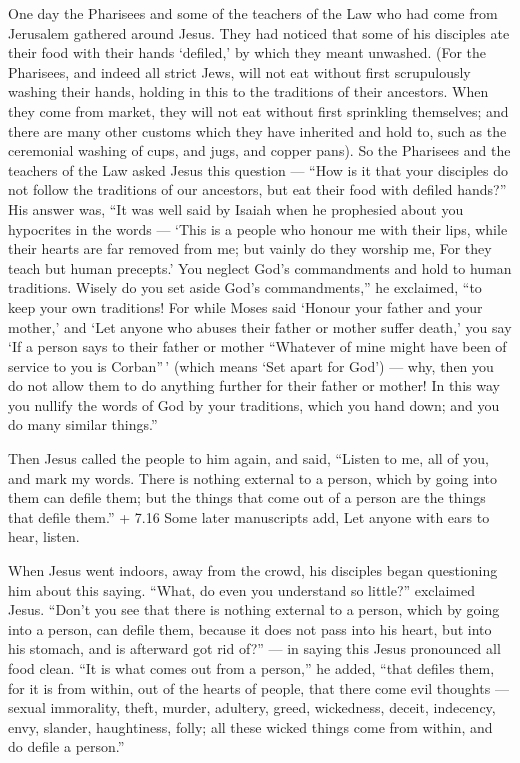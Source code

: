  One day the Pharisees and some of the teachers of the Law
who had come from Jerusalem gathered around Jesus.  They had
noticed that some of his disciples ate their food with their hands
`defiled,' by which they meant unwashed.  (For the
Pharisees, and indeed all strict Jews, will not eat without first
scrupulously washing their hands, holding in this to the traditions of
their ancestors.  When they come from market, they will not
eat without first sprinkling themselves; and there are many other
customs which they have inherited and hold to, such as the ceremonial
washing of cups, and jugs, and copper pans).  So the
Pharisees and the teachers of the Law asked Jesus this question ---
``How is it that your disciples do not follow the traditions of our
ancestors, but eat their food with defiled hands?''  His
answer was, ``It was well said by Isaiah when he prophesied about you
hypocrites in the words --- `This is a people who honour me with their
lips, while their hearts are far removed from me;  but
vainly do they worship me, For they teach but human precepts.'
 You neglect God's commandments and hold to human
traditions.  Wisely do you set aside God's commandments,''
he exclaimed, ``to keep your own traditions!  For while
Moses said `Honour your father and your mother,' and `Let anyone who
abuses their father or mother suffer death,'  you say `If a
person says to their father or mother ``Whatever of mine might have been
of service to you is Corban''\,' (which means `Set apart for God') ---
 why, then you do not allow them to do anything further for
their father or mother!  In this way you nullify the words
of God by your traditions, which you hand down; and you do many similar
things.''

 Then Jesus called the people to him again, and said,
``Listen to me, all of you, and mark my words.  There is
nothing external to a person, which by going into them can defile them;
but the things that come out of a person are the things that defile
them.''  + 7.16 Some later manuscripts add, Let anyone with
ears to hear, listen.

 When Jesus went indoors, away from the crowd, his
disciples began questioning him about this saying.  ``What,
do even you understand so little?'' exclaimed Jesus. ``Don't you see
that there is nothing external to a person, which by going into a
person, can defile them,  because it does not pass into his
heart, but into his stomach, and is afterward got rid of?'' --- in
saying this Jesus pronounced all food clean.  ``It is what
comes out from a person,'' he added, ``that defiles them, 
for it is from within, out of the hearts of people, that there come evil
thoughts --- sexual immorality, theft, murder, adultery, 
greed, wickedness, deceit, indecency, envy, slander, haughtiness, folly;
 all these wicked things come from within, and do defile a
person.''

